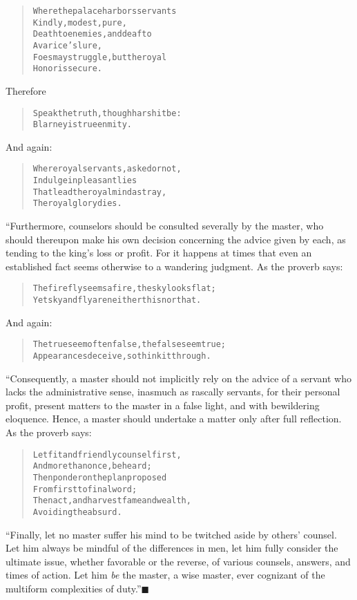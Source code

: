 \documentclass[article, twoside, 14pt]{memoir}
\newcommand{\qed}{\hfill \ensuremath{\blacksquare}}
\renewenvironment{verbatim}{%
\begin{quote}%
\vskip -10pt%
\begin{alltt}\normalfont\large}{\end{alltt}%
\end{quote}%
\vskip -10pt
} %
\begin{document}
\begin{verbatim}
Where the palace harbors servants
    Kindly, modest, pure,
Death to enemies, and deaf to
    Avarice's lure,
Foes may struggle, but the royal
    Honor is secure.
\end{verbatim}
Therefore

\begin{verbatim}
Speak the truth, though harsh it be:
Blarney is true enmity.
\end{verbatim}
And again:

\begin{verbatim}
Where royal servants, asked or not,
    Indulge in pleasant lies
That lead the royal mind astray,
    The royal glory dies.
\end{verbatim}
“Furthermore, counselors should be consulted severally by the
master, who should thereupon make his own decision concerning the
advice given by each, as tending to the king's loss or profit. For
it happens at times that even an established fact seems otherwise
to a wandering judgment. As the proverb says:

\begin{verbatim}
The firefly seems a fire, the sky looks flat;
Yet sky and fly are neither this nor that.
\end{verbatim}
And again:

\begin{verbatim}
The true seem often false, the false seem true;
Appearances deceive, so think it through.
\end{verbatim}
“Consequently, a master should not implicitly rely on the advice of
a servant who lacks the administrative sense, inasmuch as rascally
servants, for their personal profit, present matters to the master
in a false light, and with bewildering eloquence. Hence, a master
should undertake a matter only after full reflection. As the
proverb says:

\begin{verbatim}
Let fit and friendly counsel first,
    And more than once, be heard;
Then ponder on the plan proposed
    From first to final word;
Then act, and harvest fame and wealth,
    Avoiding the absurd.
\end{verbatim}
``Finally, let no master suffer his mind to be twitched aside by others' counsel. Let him always be mindful of the differences in men, let him fully consider the ultimate issue, whether favorable or the reverse, of various counsels, answers, and times of action. Let him \emph{be} the master, a wise master, ever cognizant of the multiform complexities of duty.''\hyperref[s5]{\qed}
\end{document}
